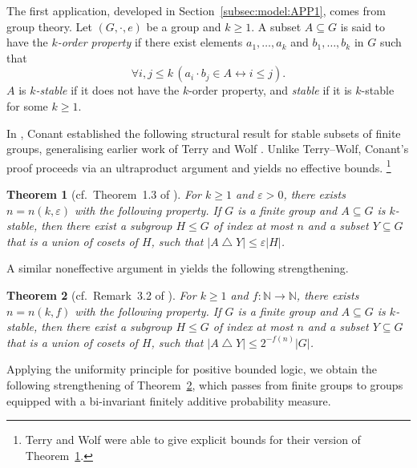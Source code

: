 \documentclass[11pt]{amsart}
\newtheorem{theorem}{Theorem}[section]
\theoremstyle{definition}
\theoremstyle{remark}
\def\NN{\mathbb{N}}
\begin{document}
The first application, developed in Section~\ref{subsec:model:APP1}, comes
from group theory. Let $(G,\cdot,e)$ be a group and $k \ge 1$. A subset
$A \subseteq G$ is said to have the \emph{$k$-order property} if there exist
elements $a_1,\ldots,a_k$ and $b_1,\ldots,b_k$ in $G$ such that
\[
  \forall i,j \le k \,(a_i \cdot b_j \in A \leftrightarrow i \le j).
\]
$A$ is \emph{$k$-stable} if it does not have the $k$-order
property, and \emph{stable} if it is $k$-stable for some $k \ge 1$.

In \cite{conant2020group}, Conant established the following structural result
for stable subsets of finite groups, generalising earlier work of Terry and
Wolf \cite{terry2019stable}. Unlike Terry--Wolf, Conant's proof proceeds via
an ultraproduct argument and yields no effective bounds.%
\footnote{Terry and Wolf were able to give explicit bounds for their version
of Theorem~\ref{thrm:1}.}

\begin{theorem}[cf.\ Theorem~1.3 of \cite{conant2020group}]
\label{thrm:1}
For $k \ge 1$ and $\varepsilon > 0$, there exists $n = n(k,\varepsilon)$
with the following property. If $G$ is a finite group and $A \subseteq G$ is
$k$-stable, then there exist a subgroup $H \le G$ of index at most $n$ and a
subset $Y \subseteq G$ that is a union of cosets of $H$, such that
$|A \mathbin{\triangle} Y| \le \varepsilon|H|$.
\end{theorem}

A similar noneffective argument in \cite{conant2020group} yields the following
strengthening.

\begin{theorem}[cf.\ Remark~3.2 of \cite{conant2020group}]
\label{thrm:meta:main}
For $k \ge 1$ and $f:\NN \to \NN$, there exists $n = n(k,f)$ with the
following property. If $G$ is a finite group and $A \subseteq G$ is $k$-stable,
then there exist a subgroup $H \le G$ of index at most $n$ and a subset
$Y \subseteq G$ that is a union of cosets of $H$, such that
$|A \mathbin{\triangle} Y| \le 2^{-f(n)}|G|$.
\end{theorem}

Applying the uniformity principle for positive bounded logic, we obtain the
following strengthening of Theorem~\ref{thrm:meta:main}, which passes from
finite groups to groups equipped with a bi-invariant finitely additive
probability measure.
\end{document}
